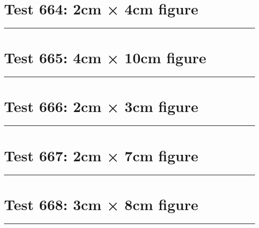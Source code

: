 \documentclass[a4paper,11pt]{article}
\begin{document}
\section*{Test 664: 2cm × 4cm figure}
\begin{swarmwrap}%
  \begin{minipage}[t]{2cm}
    \centering
    \rule{\linewidth}{4cm}
  \end{minipage}%
\end{swarmwrap}%
\swarmwrapnext
\lipsum[116]
\lipsum[117]
\lipsum[118]
\lipsum[119]
\lipsum[120]
\lipsum[121]
\section*{Test 665: 4cm × 10cm figure}
\begin{swarmwrap}%
  \begin{minipage}[t]{4cm}
    \centering
    \rule{\linewidth}{10cm}
  \end{minipage}%
\end{swarmwrap}%
\swarmwrapnext
\lipsum[28]
\lipsum[29]
\lipsum[30]
\lipsum[31]
\lipsum[32]
\lipsum[33]
\section*{Test 666: 2cm × 3cm figure}
\begin{swarmwrap}%
  \begin{minipage}[t]{2cm}
    \centering
    \rule{\linewidth}{3cm}
  \end{minipage}%
\end{swarmwrap}%
\swarmwrapnext
\lipsum[143]
\lipsum[144]
\lipsum[145]
\lipsum[146]
\lipsum[147]
\section*{Test 667: 2cm × 7cm figure}
\begin{swarmwrap}%
  \begin{minipage}[t]{2cm}
    \centering
    \rule{\linewidth}{7cm}
  \end{minipage}%
\end{swarmwrap}%
\swarmwrapnext
\lipsum[5]
\lipsum[6]
\lipsum[7]
\lipsum[8]
\lipsum[9]
\lipsum[10]
\section*{Test 668: 3cm × 8cm figure}
\begin{swarmwrap}%
  \begin{minipage}[t]{3cm}
    \centering
    \rule{\linewidth}{8cm}
  \end{minipage}%
\end{swarmwrap}%
\swarmwrapnext
\lipsum[23]
\lipsum[24]
\lipsum[25]
\lipsum[26]
\lipsum[27]
\lipsum[28]
\end{document}
